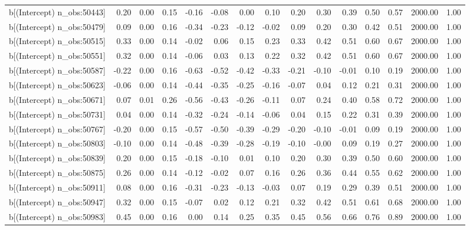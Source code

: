 \begin{table}[ht]
\begin{tabular}{rrrrrrrrrrrrrrr}
  b[(Intercept) n\_obs:50443] & 0.20 & 0.00 & 0.15 & -0.16 & -0.08 & 0.00 & 0.10 & 0.20 & 0.30 & 0.39 & 0.50 & 0.57 & 2000.00 & 1.00 \\ 
  b[(Intercept) n\_obs:50479] & 0.09 & 0.00 & 0.16 & -0.34 & -0.23 & -0.12 & -0.02 & 0.09 & 0.20 & 0.30 & 0.42 & 0.51 & 2000.00 & 1.00 \\ 
  b[(Intercept) n\_obs:50515] & 0.33 & 0.00 & 0.14 & -0.02 & 0.06 & 0.15 & 0.23 & 0.33 & 0.42 & 0.51 & 0.60 & 0.67 & 2000.00 & 1.00 \\ 
  b[(Intercept) n\_obs:50551] & 0.32 & 0.00 & 0.14 & -0.06 & 0.03 & 0.13 & 0.22 & 0.32 & 0.42 & 0.51 & 0.60 & 0.67 & 2000.00 & 1.00 \\ 
  b[(Intercept) n\_obs:50587] & -0.22 & 0.00 & 0.16 & -0.63 & -0.52 & -0.42 & -0.33 & -0.21 & -0.10 & -0.01 & 0.10 & 0.19 & 2000.00 & 1.00 \\ 
  b[(Intercept) n\_obs:50623] & -0.06 & 0.00 & 0.14 & -0.44 & -0.35 & -0.25 & -0.16 & -0.07 & 0.04 & 0.12 & 0.21 & 0.31 & 2000.00 & 1.00 \\ 
  b[(Intercept) n\_obs:50671] & 0.07 & 0.01 & 0.26 & -0.56 & -0.43 & -0.26 & -0.11 & 0.07 & 0.24 & 0.40 & 0.58 & 0.72 & 2000.00 & 1.00 \\ 
  b[(Intercept) n\_obs:50731] & 0.04 & 0.00 & 0.14 & -0.32 & -0.24 & -0.14 & -0.06 & 0.04 & 0.15 & 0.22 & 0.31 & 0.39 & 2000.00 & 1.00 \\ 
  b[(Intercept) n\_obs:50767] & -0.20 & 0.00 & 0.15 & -0.57 & -0.50 & -0.39 & -0.29 & -0.20 & -0.10 & -0.01 & 0.09 & 0.19 & 2000.00 & 1.00 \\ 
  b[(Intercept) n\_obs:50803] & -0.10 & 0.00 & 0.14 & -0.48 & -0.39 & -0.28 & -0.19 & -0.10 & -0.00 & 0.09 & 0.19 & 0.27 & 2000.00 & 1.00 \\ 
  b[(Intercept) n\_obs:50839] & 0.20 & 0.00 & 0.15 & -0.18 & -0.10 & 0.01 & 0.10 & 0.20 & 0.30 & 0.39 & 0.50 & 0.60 & 2000.00 & 1.00 \\ 
  b[(Intercept) n\_obs:50875] & 0.26 & 0.00 & 0.14 & -0.12 & -0.02 & 0.07 & 0.16 & 0.26 & 0.36 & 0.44 & 0.55 & 0.62 & 2000.00 & 1.00 \\ 
  b[(Intercept) n\_obs:50911] & 0.08 & 0.00 & 0.16 & -0.31 & -0.23 & -0.13 & -0.03 & 0.07 & 0.19 & 0.29 & 0.39 & 0.51 & 2000.00 & 1.00 \\ 
  b[(Intercept) n\_obs:50947] & 0.32 & 0.00 & 0.15 & -0.07 & 0.02 & 0.12 & 0.21 & 0.32 & 0.42 & 0.51 & 0.61 & 0.68 & 2000.00 & 1.00 \\ 
  b[(Intercept) n\_obs:50983] & 0.45 & 0.00 & 0.16 & 0.00 & 0.14 & 0.25 & 0.35 & 0.45 & 0.56 & 0.66 & 0.76 & 0.89 & 2000.00 & 1.00 \\ 

\end{tabular}
\end{table}
